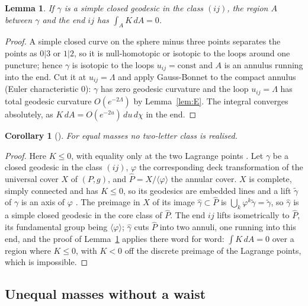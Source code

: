 \documentclass[11pt]{article}
\newtheorem{lemma}[theorem]{Lemma}
\newtheorem{corollary}[theorem]{Corollary}
\theoremstyle{definition}
\begin{document}
\begin{lemma}\label{lem:GB}
If $\gamma$ is a simple closed geodesic in the class $(ij)$, the region $A$ between $\gamma$ and the end $ij$ has
$\int_A K\,dA=0$.
\end{lemma}

\begin{proof}
A simple closed curve on the sphere minus three points separates the points as $0|3$ or $1|2$, so it is
null-homotopic or isotopic to the loops around one puncture; hence $\gamma$ is isotopic to the loops
$u_{ij}=\mathrm{const}$ and $A$ is an annulus running into the end. Cut it at $u_{ij}=\Lambda$ and apply
Gauss-Bonnet to the compact annulus (Euler characteristic $0$): $\gamma$ has zero geodesic curvature and the loop
$u_{ij}=\Lambda$ has total geodesic curvature $O(e^{-2\Lambda})$ by Lemma~\ref{lem:E}. The integral converges absolutely, as
$K\,dA=O(e^{-2u})\,du\,d\chi$ in the end.
\end{proof}

\begin{corollary}[{\cite[Thm.~3]{M05}}]
For equal masses no two-letter class is realised.
\end{corollary}

\begin{proof}
Here $K\le0$, with equality only at the two Lagrange points \cite{M05}. Let $\gamma$ be a closed geodesic in the class
$(ij)$, $\varphi$ the corresponding deck transformation of the universal cover $X$ of $(P,g)$, and
$\hat P=X/\langle\varphi\rangle$ the annular cover. $X$ is complete, simply connected and has $K\le0$, so its geodesics
are embedded lines and a lift $\tilde\gamma$ of $\gamma$ is an axis of $\varphi$ \cite[II.6]{BH99}. The preimage in $X$
of its image $\hat\gamma\subset\hat P$ is $\bigcup_k\varphi^k\tilde\gamma=\tilde\gamma$, so $\hat\gamma$ is a simple
closed geodesic in the core class of $\hat P$. The end $ij$ lifts isometrically to $\hat P$, its fundamental group being
$\langle\varphi\rangle$; $\hat\gamma$ cuts $\hat P$ into two annuli, one running into this end, and the proof of
Lemma~\ref{lem:GB} applies there word for word: $\int K\,dA=0$ over a region where $K\le0$, with $K<0$ off the discrete
preimage of the Lagrange points, which is impossible.
\end{proof}

\subsection{Unequal masses without a waist}\label{sec:converse}
\end{document}

